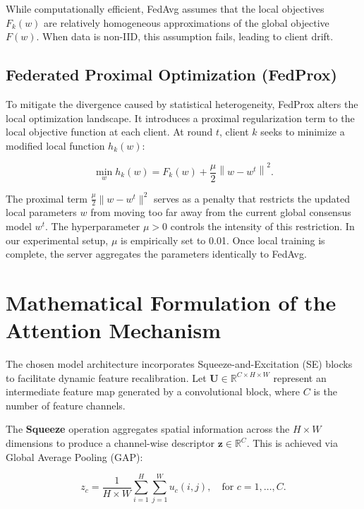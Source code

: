 \documentclass[12pt,a4paper]{report}
\begin{document}
While computationally efficient, FedAvg assumes that the local objectives $F_k(w)$ are relatively homogeneous approximations of the global objective $F(w)$. When data is non-IID, this assumption fails, leading to client drift.

\subsection{Federated Proximal Optimization (FedProx)}

To mitigate the divergence caused by statistical heterogeneity, FedProx alters the local optimization landscape. It introduces a proximal regularization term to the local objective function at each client. At round $t$, client $k$ seeks to minimize a modified local function $h_k(w)$:

\begin{equation}
\min_w h_k(w) = F_k(w) + \frac{\mu}{2} \left\| w - w^t \right\|^2.
\end{equation}

The proximal term $\frac{\mu}{2} \| w - w^t \|^2$ serves as a penalty that restricts the updated local parameters $w$ from moving too far away from the current global consensus model $w^t$. The hyperparameter $\mu > 0$ controls the intensity of this restriction. In our experimental setup, $\mu$ is empirically set to 0.01. Once local training is complete, the server aggregates the parameters identically to FedAvg.

\section{Mathematical Formulation of the Attention Mechanism}

The chosen model architecture incorporates Squeeze-and-Excitation (SE) blocks to facilitate dynamic feature recalibration. Let $\mathbf{U} \in \mathbb{R}^{C \times H \times W}$ represent an intermediate feature map generated by a convolutional block, where $C$ is the number of feature channels.

The \textbf{Squeeze} operation aggregates spatial information across the $H \times W$ dimensions to produce a channel-wise descriptor $\mathbf{z} \in \mathbb{R}^C$. This is achieved via Global Average Pooling (GAP):

\begin{equation}
z_c = \frac{1}{H \times W} \sum_{i=1}^{H} \sum_{j=1}^{W} u_c(i,j), \quad \text{for } c = 1, \dots, C.
\end{equation}
\end{document}
